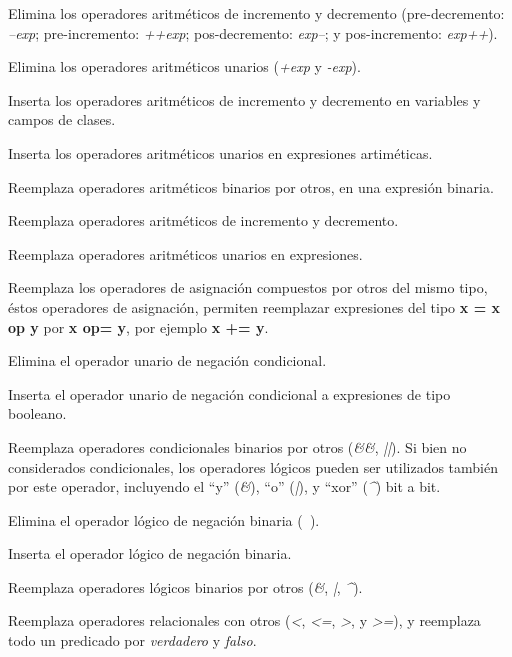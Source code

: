 \begin{description}[leftmargin=8em,style=nextline]
	\item[AODS] Elimina los operadores aritm\'eticos de incremento y decremento (pre-decremento: \emph{--exp}; pre-incremento: \emph{++exp}; pos-decremento: \emph{exp--}; y pos-incremento: \emph{exp++}).
	\item[AODU] Elimina los operadores aritm\'eticos unarios (\emph{+exp} y \emph{-exp}).
	\item[AOIS] Inserta los operadores aritm\'eticos de incremento y decremento en variables y campos de clases.
	\item[AOIU] Inserta los operadores aritm\'eticos unarios en expresiones artim\'eticas.
	\item[AORB] Reemplaza operadores aritm\'eticos binarios por otros, en una expresi\'on binaria.
	\item[AORS] Reemplaza operadores aritm\'eticos de incremento y decremento.
	\item[AORU] Reemplaza operadores aritm\'eticos unarios en expresiones.
	\item[ASRS] Reemplaza los operadores de asignaci\'on compuestos por otros del mismo tipo, \'estos operadores de asignaci\'on, permiten reemplazar expresiones del tipo \textbf{x = x op y} por \textbf{x op= y}, por ejemplo \textbf{x += y}.
	\item[COD] Elimina el operador unario de negaci\'on condicional.
	\item[COI] Inserta el operador unario de negaci\'on condicional a expresiones de tipo booleano.
	\item[COR] Reemplaza operadores condicionales binarios por otros (\emph{\&\&}, \emph{||}). Si bien no considerados condicionales, los operadores l\'ogicos pueden ser utilizados tambi\'en por este operador, incluyendo el ``y'' (\emph{\&}), ``o'' (\emph{|}), y ``xor'' (\emph{\^}) bit a bit.
	\item[LOD] Elimina el operador l\'ogico de negaci\'on binaria (\emph{~}).
	\item[LOI] Inserta el operador l\'ogico de negaci\'on binaria.
	\item[LOR] Reemplaza operadores l\'ogicos binarios por otros (\emph{\&}, \emph{|}, \emph{\^}).
	\item[ROR] Reemplaza operadores relacionales con otros (\emph{<}, \emph{<=}, \emph{>}, y \emph{>=}), y reemplaza todo un predicado por \emph{verdadero} y \emph{falso}.
\end{description}

